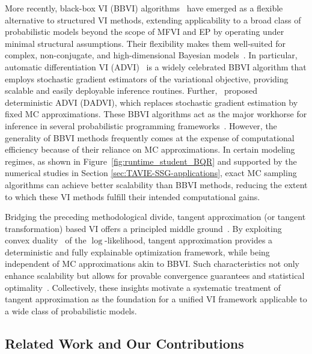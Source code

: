\documentclass[12pt]{article}
\numberwithin{equation}{section}
\begin{document}
More recently, black-box VI (BBVI) algorithms~\citep{ranganath2014bbvi,Blei-VI-review-JASA} have emerged as a flexible alternative to structured VI methods, extending applicability to a broad class of probabilistic models beyond the scope of MFVI and EP by operating under minimal structural assumptions. Their flexibility makes them well-suited for complex, non-conjugate, and high-dimensional Bayesian models~\citep{kingma2014vae}.
In particular, automatic differentiation VI (ADVI)~\citep{advi} is a widely celebrated BBVI algorithm that employs stochastic gradient estimators of the variational objective, providing scalable and easily deployable inference routines. Further,~\cite{dadvi} proposed deterministic ADVI (DADVI), which replaces stochastic gradient estimation by fixed MC approximations. These BBVI algorithms act as the major workhorse for inference in several probabilistic programming frameworks~\citep{gal2016dropout,tran2016edward,bingham2019pyro}. However, the generality of BBVI methods frequently comes at the expense of computational efficiency because of their reliance on MC approximations.  In certain modeling regimes, as shown in Figure~\ref{fig:runtime_student_BQR} and supported by the numerical studies in Section \ref{sec:TAVIE-SSG-applications}, exact MC sampling algorithms can achieve better scalability than BBVI methods, reducing the extent to which these VI methods fulfill their intended computational gains.

Bridging the preceding methodological divide, tangent approximation (or tangent transformation) based VI offers a principled middle ground~\citep{Jaakkola-PhD-thesis,Jaakkola-Jordan-2000}. By exploiting convex duality~\citep{Rockafellar1970} of the $\log$-likelihood, tangent approximation provides a deterministic and fully explainable optimization framework, while being independent of MC approximations akin to BBVI. Such characteristics not only enhance scalability but allows for provable convergence guarantees and statistical optimality~\citep{Ghosh-JMLR-VI}. Collectively, these insights motivate a systematic treatment of tangent approximation as the foundation for a unified VI framework applicable to a wide class of probabilistic models.

\subsection{Related Work and Our Contributions}
\label{subsec:related-works-contribution}
\end{document}
